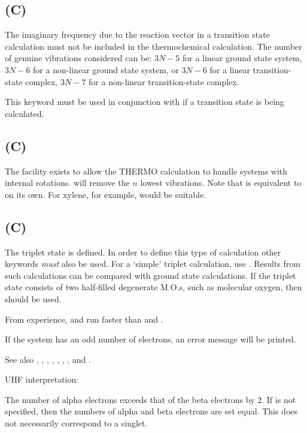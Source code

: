 \subsection*{ (C)} 
    The imaginary frequency due to the reaction vector in  a
    transition state calculation must not be included in the
   thermochemical calculation.  The number of genuine vibrations
   considered can be:
    $3N-5$ for a linear ground state system, $3N-6$ for a
    non-linear ground state system, or $3N-6$ for a linear
    transition-state complex, $3N-7$ for a non-linear
    transition-state complex.

        This keyword must be used in conjunction with  if
a transition state is being calculated.



\subsection*{ (C)}
        The facility exists  to  allow  the  THERMO  calculation  to  handle
   systems  with  internal  rotations.     will  remove  the $n$ lowest
   vibrations.  Note that  is equivalent to  on  its  own.   For
   xylene, for example,  would be suitable.


\subsection*{ (C)}
        The triplet state is defined.  In order to define this type of calculation
other keywords {\em must} also be used.  For a `simple' triplet calculation,
use .  Results from such calculations can be compared with
ground state calculations.
If the triplet state consists of two half-filled degenerate M.O.s,
such as molecular oxygen,
then  should be used.

From experience,   and  run faster
than  and .

 If the system has an  odd  number  of
   electrons,  an error message will be printed.

See also , , , ,
, , ,  and .

UHF interpretation:

        The number of alpha electrons exceeds that of the beta electrons  by
   2.   If    is  not  specified,  then the numbers of alpha and beta
   electrons are set equal.  This  does  not  necessarily  correspond  to  a
   singlet.

